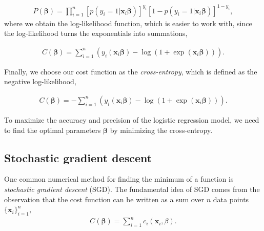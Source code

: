 
\begin{align*}
P(\boldsymbol{\beta}) = \prod_{i=1}^{n} \left[ p(y_i=1|\boldsymbol{x}_i \boldsymbol{\beta}) \right]^{y_i} \left[1- p(y_i=1|\boldsymbol{x}_i \boldsymbol{\beta}) \right]^{1-y_i},
\end{align*}
\noindent where we obtain the log-likelihood function, which is easier to work with, since the log-likelihood turns the exponentials into summations,%

\begin{align*}
C(\boldsymbol{\beta}) = \sum_{i=1}^n \left(y_i\left(\boldsymbol{x}_i \boldsymbol{\beta}\right) - \log{ \left(1 + \exp \left(\boldsymbol{x}_i \boldsymbol{\beta}\right)\right)}  \right).
\end{align*}

\noindent Finally, we choose our cost function as the \textit{cross-entropy}, which is defined as the negative log-likelihood,


%
\begin{align*}
C(\boldsymbol{\beta}) = - \sum_{i=1}^n \left(y_i\left(\boldsymbol{x}_i \boldsymbol{\beta}\right) - \log{ \left(1 + \exp \left(\boldsymbol{x}_i \boldsymbol{\beta}\right)\right)}  \right).
\end{align*}

\noindent To maximize the accuracy and precision of the logistic regression model, we need to find the optimal parameters $\boldsymbol{\beta}$ by minimizing the cross-entropy.

\subsection{Stochastic gradient descent}

One common numerical method for finding the minimum of a function is \textit{stochastic gradient descent} (SGD). The fundamental idea of SGD comes from the observation that the cost function can be written as a sum over $n$ data points $\{\boldsymbol{x}_i\}_{i=1}^{n}$,
\begin{align*}
C(\boldsymbol{\beta}) = \sum_{i=1}^{n} c_i(\boldsymbol{x}_i,\beta).
\end{align*}

